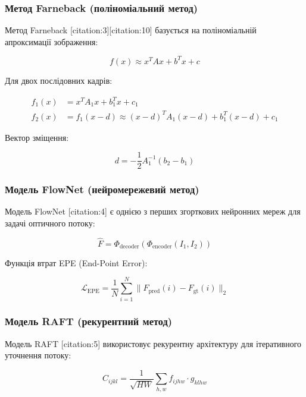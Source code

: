 \documentclass[14pt, a4paper]{extarticle}
\numberwithin{equation}{section}
\begin{document}
\subsubsection{Метод Farneback (поліноміальний метод)}

Метод Farneback [citation:3][citation:10] базується на поліноміальній апроксимації зображення:

\begin{equation}
f(x) \approx x^T A x + b^T x + c \tag{23}
\end{equation}

Для двох послідовних кадрів:

\begin{align}
f_1(x) &= x^T A_1 x + b_1^T x + c_1 \tag{24} \\
f_2(x) &= f_1(x-d) \approx (x-d)^T A_1 (x-d) + b_1^T (x-d) + c_1 \tag{25}
\end{align}

Вектор зміщення:

\begin{equation}
d = -\frac{1}{2} A_1^{-1} (b_2 - b_1) \tag{26}
\end{equation}

\subsubsection{Модель FlowNet (нейромережевий метод)}

Модель FlowNet [citation:4] є однією з перших згорткових нейронних мереж для задачі оптичного потоку:

\begin{equation}
\hat{F} = \Phi_{\text{decoder}}(\Phi_{\text{encoder}}(I_1, I_2)) \tag{27}
\end{equation}

Функція втрат EPE (End-Point Error):

\begin{equation}
\mathcal{L}_{\text{EPE}} = \frac{1}{N} \sum_{i=1}^N \|F_{\text{pred}}(i) - F_{\text{gt}}(i)\|_2 \tag{28}
\end{equation}

\subsubsection{Модель RAFT (рекурентний метод)}

Модель RAFT [citation:5] використовує рекурентну архітектуру для ітеративного уточнення потоку:

\begin{equation}
C_{ijkl} = \frac{1}{\sqrt{HW}} \sum_{h,w} f_{ijhw} \cdot g_{klhw} \tag{29}
\end{equation}
\end{document}
